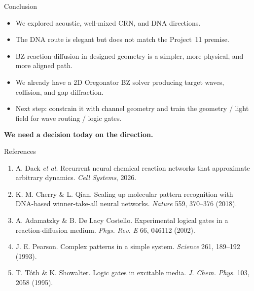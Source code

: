 \documentclass[aspectratio=169,11pt]{beamer}
\begin{document}
\begin{frame}{Conclusion}

\begin{itemize}
    \item We explored acoustic, well-mixed CRN, and DNA directions.
    \item The DNA route is elegant but does not match the Project~11 premise.
    \item BZ reaction-diffusion in designed geometry is a simpler, more physical, and more aligned path.
    \item We already have a 2D Oregonator BZ solver producing target waves, collision, and gap diffraction.
    \item Next step: constrain it with channel geometry and train the geometry / light field for wave routing / logic gates.
\end{itemize}

\vspace{0.4cm}
\centering
\textbf{We need a decision today on the direction.}

\end{frame}

\begin{frame}{References}

{\footnotesize
\begin{enumerate}
    \item A. Dack \textit{et al.} Recurrent neural chemical reaction networks that approximate arbitrary dynamics. \textit{Cell Systems}, 2026.
    \item K. M. Cherry \& L. Qian. Scaling up molecular pattern recognition with DNA-based winner-take-all neural networks. \textit{Nature} 559, 370--376 (2018).
    \item A. Adamatzky \& B. De Lacy Costello. Experimental logical gates in a reaction-diffusion medium. \textit{Phys. Rev. E} 66, 046112 (2002).
    \item J. E. Pearson. Complex patterns in a simple system. \textit{Science} 261, 189--192 (1993).
    \item T. Tóth \& K. Showalter. Logic gates in excitable media. \textit{J. Chem. Phys.} 103, 2058 (1995).
\end{enumerate}
}

\end{frame}
\end{document}
